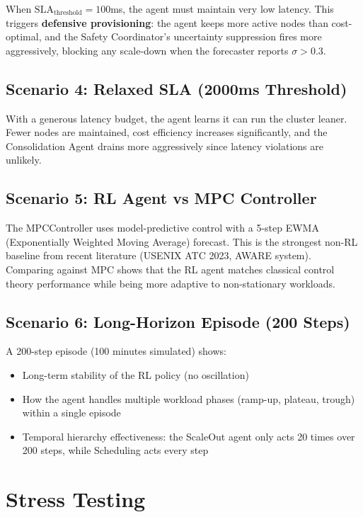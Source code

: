 \documentclass[11pt,a4paper]{article}
\begin{document}
When $\text{SLA}_{\text{threshold}} = 100$ms, the agent must maintain very low
latency. This triggers \textbf{defensive provisioning}: the agent keeps more
active nodes than cost-optimal, and the Safety Coordinator's uncertainty
suppression fires more aggressively, blocking any scale-down when the
forecaster reports $\sigma > 0.3$.

\subsection{Scenario 4: Relaxed SLA (2000ms Threshold)}

With a generous latency budget, the agent learns it can run the cluster
leaner. Fewer nodes are maintained, cost efficiency increases significantly,
and the Consolidation Agent drains more aggressively since latency violations
are unlikely.

\subsection{Scenario 5: RL Agent vs MPC Controller}

The MPCController uses model-predictive control with a 5-step EWMA
(Exponentially Weighted Moving Average) forecast. This is the strongest
non-RL baseline from recent literature (USENIX ATC 2023, AWARE system).
Comparing against MPC shows that the RL agent matches classical control
theory performance while being more adaptive to non-stationary workloads.

\subsection{Scenario 6: Long-Horizon Episode (200 Steps)}

A 200-step episode (100 minutes simulated) shows:
\begin{itemize}[leftmargin=2em]
  \item Long-term stability of the RL policy (no oscillation)
  \item How the agent handles multiple workload phases (ramp-up, plateau,
        trough) within a single episode
  \item Temporal hierarchy effectiveness: the ScaleOut agent only acts
        20 times over 200 steps, while Scheduling acts every step
\end{itemize}


\section{Stress Testing}\label{sec:stress}
\end{document}
